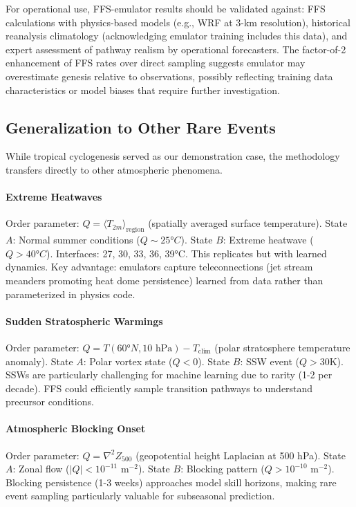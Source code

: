 \documentclass[11pt]{article}
\begin{document}
For operational use, FFS-emulator results should be validated against: FFS calculations with physics-based models (e.g., WRF at 3-km resolution), historical reanalysis climatology (acknowledging emulator training includes this data), and expert assessment of pathway realism by operational forecasters. The factor-of-2 enhancement of FFS rates over direct sampling suggests emulator may overestimate genesis relative to observations, possibly reflecting training data characteristics or model biases that require further investigation.

\subsection{Generalization to Other Rare Events}

While tropical cyclogenesis served as our demonstration case, the methodology transfers directly to other atmospheric phenomena.

\paragraph{Extreme Heatwaves}
Order parameter: $Q = \langle T_{2m} \rangle_{\text{region}}$ (spatially averaged surface temperature). State $A$: Normal summer conditions ($Q \sim 25°C$). State $B$: Extreme heatwave ($Q > 40°C$). Interfaces: 27, 30, 33, 36, 39°C. This replicates \citet{ragone2018computation} but with learned dynamics. Key advantage: emulators capture teleconnections (jet stream meanders promoting heat dome persistence) learned from data rather than parameterized in physics code.

\paragraph{Sudden Stratospheric Warmings}
Order parameter: $Q = T(60°N, 10 \text{ hPa}) - T_{\text{clim}}$ (polar stratosphere temperature anomaly). State $A$: Polar vortex state ($Q < 0$). State $B$: SSW event ($Q > 30$K). SSWs are particularly challenging for machine learning due to rarity (1-2 per decade). FFS could efficiently sample transition pathways to understand precursor conditions.

\paragraph{Atmospheric Blocking Onset}
Order parameter: $Q = \nabla^2 Z_{500}$ (geopotential height Laplacian at 500 hPa). State $A$: Zonal flow ($|Q| < 10^{-11}$ m$^{-2}$). State $B$: Blocking pattern ($Q > 10^{-10}$ m$^{-2}$). Blocking persistence (1-3 weeks) approaches model skill horizons, making rare event sampling particularly valuable for subseasonal prediction.
\end{document}
